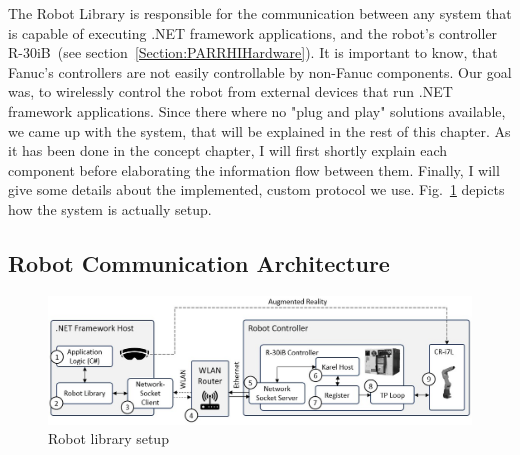 The Robot Library is responsible for the communication between any system that is capable of executing .NET framework applications, and the robot's controller R-30iB~(see section~\ref{Section:PARRHIHardware}). It is important to know, that Fanuc's controllers are not easily controllable by non-Fanuc components. Our goal was, to wirelessly control the robot from external devices that run .NET framework applications. Since there where no "plug and play" solutions available, we came up with the system, that will be explained in the rest of this chapter. As it has been done in the concept chapter, I will first shortly explain each component before elaborating the information flow between them. Finally, I will give some details about the implemented, custom protocol we use. Fig.~\ref{Fig:RobotArchitecture} depicts how the system is actually setup.

\subsection{Robot Communication Architecture}

\begin{figure}
	\centering
	\includegraphics[width=1\textwidth]{Figures/RobotArchitecture.jpg}
	\caption{Robot library setup}
	\label{Fig:RobotArchitecture}
\end{figure}

